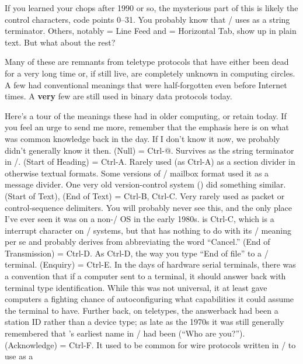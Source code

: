 If you learned your chops after 1990 or so, the mysterious part of this is
likely the control characters, code points 0--31. You probably know that \CEE/ uses
 as a string terminator. Others, notably  = Line Feed and  = Horizontal
Tab, show up in plain text. But what about the rest?

Many of these are remnants from teletype protocols that have either been dead
for a very long time or, if still live, are completely unknown in computing
circles. A few had conventional meanings that were half-forgotten even before
Internet times. A {\bf very} few are still used in binary data protocols today.

Here's a tour of the meanings these had in older computing, or retain today. If
you feel an urge to send me more, remember that the emphasis here is on what
was common knowledge back in the day. If I don't know it now, we probably
didn't generally know it then.
\medbreak
\dlist {} (Null) = Ctrl-@. Survives as the string terminator in \CEE/.
\dlist {} (Start of Heading) = Ctrl-A. Rarely used (as Ctrl-A) as a section
divider in otherwise textual formats. Some versions of \UNIX/ mailbox format used
it as a message divider. One very old version-control system () did
something similar.
\dlist {} (Start of Text),  (End of Text) = Ctrl-B, Ctrl-C. Very rarely
used as packet or control-sequence delimiters. You will probably never see
this, and the only place I've ever seen it was on a non-\UNIX/ OS in the early
1980s.  is Ctrl-C, which is a  interrupt character on \UNIX/ systems,
but that has nothing to do with its \ASCII/ meaning per se and probably derives
from abbreviating the word ``Cancel.''
\dlist {} (End of Transmission) = Ctrl-D. As Ctrl-D, the way you type ``End of
file'' to a \UNIX/ terminal.
\dlist {} (Enquiry) = Ctrl-E. In the days of hardware serial terminals, there
was a convention that if a computer sent  to a terminal, it should answer
back with terminal type identification. While this was not universal, it at
least gave computers a fighting chance of autoconfiguring what capabilities it
could assume the terminal to have. Further back, on teletypes, the answerback
had been a station ID rather than a device type; as late as the 1970s it was
still generally remembered that 's earliest name in \ASCII/ had been  (``Who
are you?'').
\dlist {} (Acknowledge) = Ctrl-F.
It used to be common for wire protocols written in \ASCII/ to use  as a
